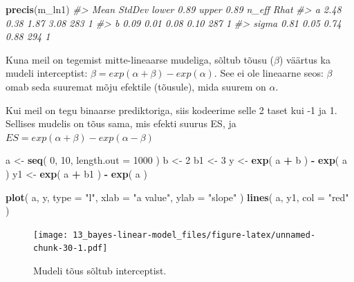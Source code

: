 \documentclass[]{book}
\newenvironment{Shaded}{\begin{snugshade}}{\end{snugshade}}
\newcommand{\KeywordTok}[1]{\textcolor[rgb]{0.13,0.29,0.53}{\textbf{#1}}}
\newcommand{\DataTypeTok}[1]{\textcolor[rgb]{0.13,0.29,0.53}{#1}}
\newcommand{\DecValTok}[1]{\textcolor[rgb]{0.00,0.00,0.81}{#1}}
\newcommand{\StringTok}[1]{\textcolor[rgb]{0.31,0.60,0.02}{#1}}
\newcommand{\CommentTok}[1]{\textcolor[rgb]{0.56,0.35,0.01}{\textit{#1}}}
\newcommand{\OperatorTok}[1]{\textcolor[rgb]{0.81,0.36,0.00}{\textbf{#1}}}
\newcommand{\NormalTok}[1]{#1}
\begin{document}
\begin{Shaded}
\begin{Highlighting}[]
\KeywordTok{precis}\NormalTok{(m_ln1)}
\CommentTok{#>       Mean StdDev lower 0.89 upper 0.89 n_eff Rhat}
\CommentTok{#> a     2.48   0.38       1.87       3.08   283    1}
\CommentTok{#> b     0.09   0.01       0.08       0.10   287    1}
\CommentTok{#> sigma 0.81   0.05       0.74       0.88   294    1}
\end{Highlighting}
\end{Shaded}

Kuna meil on tegemist mitte-lineaarse mudeliga, sõltub tõusu (\(\beta\))
väärtus ka mudeli interceptist:
\(\beta = exp(\alpha + \beta)-exp(\alpha)\). See ei ole lineaarne seos:
\(\beta\) omab seda suuremat mõju efektile (tõusule), mida suurem on
\(\alpha\).

Kui meil on tegu binaarse prediktoriga, siis kodeerime selle 2 taset kui
-1 ja 1. Sellises mudelis on tõus sama, mis efekti suurus ES, ja
\(ES = exp(\alpha + \beta)-exp(\alpha-\beta)\)

\begin{Shaded}
\begin{Highlighting}[]
\NormalTok{a <-}\StringTok{ }\KeywordTok{seq}\NormalTok{( }\DecValTok{0}\NormalTok{, }\DecValTok{10}\NormalTok{, }\DataTypeTok{length.out =} \DecValTok{1000}\NormalTok{ )}
\NormalTok{b <-}\StringTok{ }\DecValTok{2}
\NormalTok{b1 <-}\StringTok{ }\DecValTok{3}
\NormalTok{y <-}\StringTok{ }\KeywordTok{exp}\NormalTok{( a }\OperatorTok{+}\StringTok{ }\NormalTok{b ) }\OperatorTok{-}\StringTok{ }\KeywordTok{exp}\NormalTok{( a )}
\NormalTok{y1 <-}\StringTok{ }\KeywordTok{exp}\NormalTok{( a }\OperatorTok{+}\StringTok{ }\NormalTok{b1 ) }\OperatorTok{-}\StringTok{ }\KeywordTok{exp}\NormalTok{( a )}

\KeywordTok{plot}\NormalTok{( a, y, }\DataTypeTok{type =} \StringTok{"l"}\NormalTok{, }\DataTypeTok{xlab =} \StringTok{"a value"}\NormalTok{, }\DataTypeTok{ylab =} \StringTok{"slope"}\NormalTok{ )}
\KeywordTok{lines}\NormalTok{( a, y1, }\DataTypeTok{col =} \StringTok{"red"}\NormalTok{ )}
\end{Highlighting}
\end{Shaded}

\begin{figure}
\centering
\texttt{[image: 13\_bayes-linear-model\_files/figure-latex/unnamed-chunk-30-1.pdf]}
\caption{\label{fig:unnamed-chunk-30}Mudeli tõus sõltub interceptist.}
\end{figure}
\end{document}
